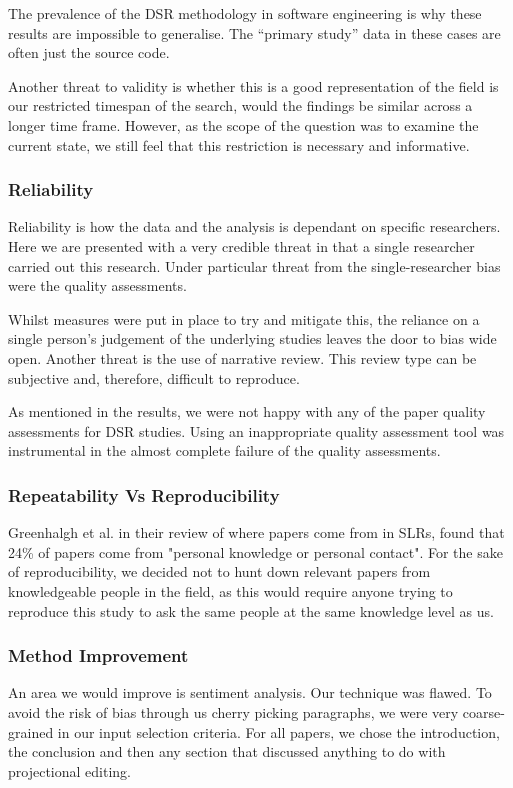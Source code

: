 The prevalence of the DSR methodology in software engineering is why these results are impossible to generalise.
The ``primary study'' data in these cases are often just the source code.

Another threat to validity is whether this is a good representation of the field is our restricted timespan of the search, would the findings be similar across a longer time frame.
However, as the scope of the question was to examine the current state, we still feel that this restriction is necessary and informative.

\subsubsection{Reliability}
Reliability is how the data and the analysis is dependant on specific researchers.
Here we are presented with a very credible threat in that a single researcher carried out this research.
Under particular threat from the single-researcher bias were the quality assessments. 

Whilst measures were put in place to try and mitigate this, the reliance on a single person's judgement of the underlying studies leaves the door to bias wide open.
Another threat is the use of narrative review. 
This review type can be subjective and, therefore, difficult to reproduce.

As mentioned in the results, we were not happy with any of the paper quality assessments for DSR studies.
Using an inappropriate quality assessment tool was instrumental in the almost complete failure of the quality assessments.


\subsubsection{Repeatability Vs Reproducibility}
Greenhalgh et al.\cite{GreenhalghTrisha2005Eaeo} in their review of where papers come from in SLRs, found that 24\% of papers come from "personal knowledge or personal contact".
For the sake of reproducibility, we decided not to hunt down relevant papers from knowledgeable people in the field, as this would require anyone trying to reproduce this study to ask the same people at the same knowledge level as us.

\subsubsection{Method Improvement}
An area we would improve is sentiment analysis.
Our technique was flawed.
To avoid the risk of bias through us cherry picking paragraphs, we were very coarse-grained in our input selection criteria.
For all papers, we chose the introduction, the conclusion and then any section that discussed anything to do with projectional editing.

